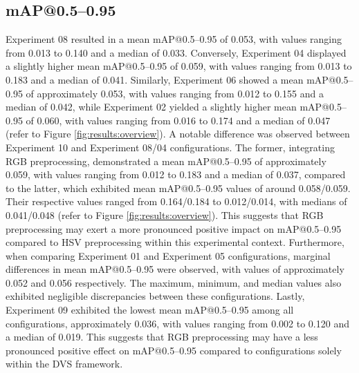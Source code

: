 \documentclass[sigchi,screen]{acmart}
\begin{document}
\subsection{mAP@0.5--0.95}
Experiment 08 resulted in a mean mAP@0.5--0.95 of 0.053, with values ranging from 0.013 to 0.140 and a median of 0.033. Conversely, Experiment 04 displayed a slightly higher mean mAP@0.5--0.95 of 0.059, with values ranging from 0.013 to 0.183 and a median of 0.041. Similarly, Experiment 06 showed a mean mAP@0.5--0.95 of approximately 0.053, with values ranging from 0.012 to 0.155 and a median of 0.042, while Experiment 02 yielded a slightly higher mean mAP@0.5--0.95 of 0.060, with values ranging from 0.016 to 0.174 and a median of 0.047 (refer to Figure \ref{fig:results:overview}). A notable difference was observed between Experiment 10 and Experiment 08/04 configurations. The former, integrating RGB preprocessing, demonstrated a mean mAP@0.5--0.95 of approximately 0.059, with values ranging from 0.012 to 0.183 and a median of 0.037, compared to the latter, which exhibited mean mAP@0.5--0.95 values of around 0.058/0.059. Their respective values ranged from 0.164/0.184 to 0.012/0.014, with medians of 0.041/0.048 (refer to Figure \ref{fig:results:overview}). This suggests that RGB preprocessing may exert a more pronounced positive impact on mAP@0.5--0.95 compared to HSV preprocessing within this experimental context. Furthermore, when comparing Experiment 01 and Experiment 05 configurations, marginal differences in mean mAP@0.5--0.95 were observed, with values of approximately 0.052 and 0.056 respectively. The maximum, minimum, and median values also exhibited negligible discrepancies between these configurations. Lastly, Experiment 09 exhibited the lowest mean mAP@0.5--0.95 among all configurations, approximately 0.036, with values ranging from 0.002 to 0.120 and a median of 0.019. This suggests that RGB preprocessing may have a less pronounced positive effect on mAP@0.5--0.95 compared to configurations solely within the DVS framework.
\end{document}
